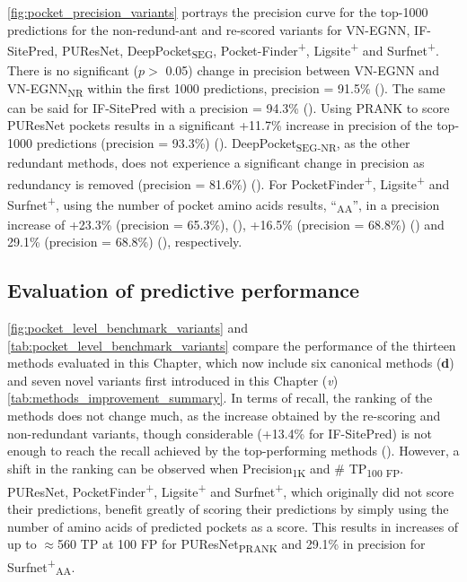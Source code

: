 \autoref{fig:pocket_precision_variants} portrays the precision curve for the top-1000 predictions for the non-redund-ant and re-scored variants for VN-EGNN, IF-SitePred, PUResNet, DeepPocket\textsubscript{SEG}, Pocket-Finder\textsuperscript{+}, Ligsite\textsuperscript{+} and Surfnet\textsuperscript{+}. There is no significant ($p >$ 0.05) change in precision between VN-EGNN and VN-EGNN\textsubscript{NR} within the first 1000 predictions, precision = 91.5\% (). The same can be said for IF-SitePred with a precision = 94.3\% (). Using PRANK to score PUResNet pockets results in a significant +11.7\% increase in precision of the top-1000 predictions (precision = 93.3\%) (). DeepPocket\textsubscript{SEG-NR}, as the other redundant methods, does not experience a significant change in precision as redundancy is removed (precision = 81.6\%) (). For PocketFinder\textsuperscript{+}, Ligsite\textsuperscript{+} and Surfnet\textsuperscript{+}, using the number of pocket amino acids results, ``\textsubscript{AA}'', in a precision increase of +23.3\% (precision = 65.3\%), (), +16.5\% (precision = 68.8\%) () and 29.1\% (precision = 68.8\%) (), respectively. 

\subsection{Evaluation of predictive performance}

\autoref{fig:pocket_level_benchmark_variants} and \autoref{tab:pocket_level_benchmark_variants} compare the performance of the thirteen methods evaluated in this Chapter, which now include six canonical methods (\textbf{d}) and seven novel variants first introduced in this Chapter (\textit{v}) \autoref{tab:methods_improvement_summary}. In terms of recall, the ranking of the methods does not change much, as the increase obtained by the re-scoring and non-redundant variants, though considerable (+13.4\% for IF-SitePred) is not enough to reach the recall achieved by the top-performing methods (). However, a shift in the ranking can be observed when Precision\textsubscript{1K} and \# TP\textsubscript{100 FP}. PUResNet, PocketFinder\textsuperscript{+}, Ligsite\textsuperscript{+} and Surfnet\textsuperscript{+}, which originally did not score their predictions, benefit greatly of scoring their predictions by simply using the number of amino acids of predicted pockets as a score. This results in increases of up to $\approx$560 TP at 100 FP for PUResNet\textsubscript{PRANK} and 29.1\% in precision for Surfnet\textsuperscript{+}\textsubscript{AA}.

